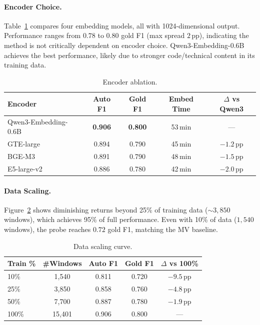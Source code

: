 \documentclass[11pt]{article}
\begin{document}
\paragraph{Encoder Choice.}
Table~\ref{tab:encoder} compares four embedding models, all with 1024-dimensional output.
Performance ranges from $0.78$ to $0.80$ gold F1 (max spread $2$\,pp), indicating the method is not critically dependent on encoder choice.
Qwen3-Embedding-0.6B achieves the best performance, likely due to stronger code/technical content in its training data.

\begin{table}[t]
\centering
\caption{Encoder ablation.}
\label{tab:encoder}
\small
\begin{tabular}{lcccc}
\toprule
Encoder & Auto F1 & Gold F1 & Embed Time & $\Delta$ vs Qwen3 \\
\midrule
Qwen3-Embedding-0.6B & \textbf{0.906} & \textbf{0.800} & 53\,min & --- \\
GTE-large & 0.894 & 0.790 & 45\,min & $-1.2$\,pp \\
BGE-M3 & 0.891 & 0.790 & 48\,min & $-1.5$\,pp \\
E5-large-v2 & 0.886 & 0.780 & 42\,min & $-2.0$\,pp \\
\bottomrule
\end{tabular}
\end{table}

\paragraph{Data Scaling.}
Figure~\ref{tab:scaling} shows diminishing returns beyond 25\% of training data (${\sim}3{,}850$ windows), which achieves 95\% of full performance.
Even with 10\% of data ($1{,}540$ windows), the probe reaches $0.72$ gold F1, matching the MV baseline.

\begin{table}[t]
\centering
\caption{Data scaling curve.}
\label{tab:scaling}
\small
\begin{tabular}{lcccc}
\toprule
Train \% & \#Windows & Auto F1 & Gold F1 & $\Delta$ vs 100\% \\
\midrule
10\% & 1,540 & 0.811 & 0.720 & $-9.5$\,pp \\
25\% & 3,850 & 0.858 & 0.760 & $-4.8$\,pp \\
50\% & 7,700 & 0.887 & 0.780 & $-1.9$\,pp \\
100\% & 15,401 & 0.906 & 0.800 & --- \\
\bottomrule
\end{tabular}
\end{table}
\end{document}
